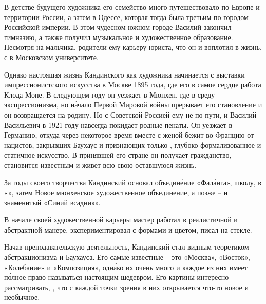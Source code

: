 В детстве будущего художника его семейство много путешествовало по Европе и территории России, а затем  в Одессе, которая тогда была третьим по  городом Российской империи. В этом чудесном южном городе Василий закончил гимназию, а также получил музыкальное и художественное образование. Несмотря на   мальчика, родители  ему карьеру юриста, что он и воплотил в жизнь,  с  в Московском университете.

Однако настоящая жизнь Кандинского как художника начинается с выставки импрессионистского искусства в Москве 1895 года, где его в самое сердце  работа Клода Моне.
В следующем году он уезжает в Мюнхен, где  в среду экспрессионизма, но н\'{а}чало Первой Мировой войны прерывает его становление и он возвращается на родину. Но с Советской Россией ему не по пути, и Василий Васильевич в 1921 году навсегда покидает родные пенаты. Он уезжает в Германию, откуда через некоторое время вместе с женой бежит во Францию от нацистов, закрывших Баухаус и признающих только , глубоко формализованное и статичное искусство. В принявшей его стране он получает гражданство, становится известным и живет всю свою оставшуюся жизнь.

За годы своего творчества Кандинский основал объедин\'{е}ние «Фал\'{а}нга», школу,  в «», затем  Новое мюнхенское художественное объединение, а позже -- и знаменитый «Синий всадник».

В начале своей художественной карьеры мастер работал в реалистичной и  абстрактной манере, экспериментировал с формами и цветом, писал на стекле.

Начав преподавательскую деятельность, Кандинский  стал видным теоретиком абстракционизма и Баухауса. Его самые известные  -- это «Москва», «Восток», «Колебание» и «Композиция», одн\'{а}ко их очень много и каждое из них имеет п\'{о}лное право называться настоящим шедевром. Его картины  интересно рассматривать,  , что с каждой точки зрения в них открывается что-то новое и необычное.

